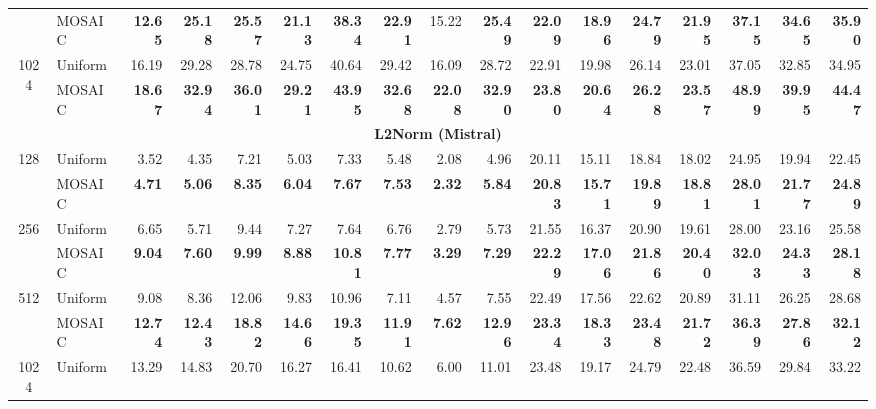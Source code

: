 \begin{table}[tp]
\begin{tabular}{@{} c l rrrr rrrr rrrr rrr @{}}
     & MOSAIC & \textbf{12.65} & \textbf{25.18} & \textbf{25.57} & \textbf{21.13} & \textbf{38.34} & \textbf{22.91} & 15.22 & \textbf{25.49} & \textbf{22.09} & \textbf{18.96} & \textbf{24.79} & \textbf{21.95} & \textbf{37.15} & \textbf{34.65} & \textbf{35.90} \\
    \cmidrule(l){1-17}
    \multirow{2}{*}{1024} & Uniform & 16.19 & 29.28 & 28.78 & 24.75 & 40.64 & 29.42 & 16.09 & 28.72 & 22.91 & 19.98 & 26.14 & 23.01 & 37.05 & 32.85 & 34.95 \\
     & MOSAIC & \textbf{18.67} & \textbf{32.94} & \textbf{36.01} & \textbf{29.21} & \textbf{43.95} & \textbf{32.68} & \textbf{22.08} & \textbf{32.90} & \textbf{23.80} & \textbf{20.64} & \textbf{26.28} & \textbf{23.57} & \textbf{48.99} & \textbf{39.95} & \textbf{44.47} \\
    \midrule
    \multicolumn{17}{c}{\textbf{L2Norm (Mistral)}} \\
    \midrule
    \multirow{2}{*}{128} & Uniform & 3.52 & 4.35 & 7.21 & 5.03 & 7.33 & 5.48 & 2.08 & 4.96 & 20.11 & 15.11 & 18.84 & 18.02 & 24.95 & 19.94 & 22.45 \\
     & MOSAIC & \textbf{4.71} & \textbf{5.06} & \textbf{8.35} & \textbf{6.04} & \textbf{7.67} & \textbf{7.53} & \textbf{2.32} & \textbf{5.84} & \textbf{20.83} & \textbf{15.71} & \textbf{19.89} & \textbf{18.81} & \textbf{28.01} & \textbf{21.77} & \textbf{24.89} \\
    \cmidrule(l){1-17}
    \multirow{2}{*}{256} & Uniform & 6.65 & 5.71 & 9.44 & 7.27 & 7.64 & 6.76 & 2.79 & 5.73 & 21.55 & 16.37 & 20.90 & 19.61 & 28.00 & 23.16 & 25.58 \\
     & MOSAIC & \textbf{9.04} & \textbf{7.60} & \textbf{9.99} & \textbf{8.88} & \textbf{10.81} & \textbf{7.77} & \textbf{3.29} & \textbf{7.29} & \textbf{22.29} & \textbf{17.06} & \textbf{21.86} & \textbf{20.40} & \textbf{32.03} & \textbf{24.33} & \textbf{28.18} \\
    \cmidrule(l){1-17}
    \multirow{2}{*}{512} & Uniform & 9.08 & 8.36 & 12.06 & 9.83 & 10.96 & 7.11 & 4.57 & 7.55 & 22.49 & 17.56 & 22.62 & 20.89 & 31.11 & 26.25 & 28.68 \\
     & MOSAIC & \textbf{12.74} & \textbf{12.43} & \textbf{18.82} & \textbf{14.66} & \textbf{19.35} & \textbf{11.91} & \textbf{7.62} & \textbf{12.96} & \textbf{23.34} & \textbf{18.33} & \textbf{23.48} & \textbf{21.72} & \textbf{36.39} & \textbf{27.86} & \textbf{32.12} \\
    \cmidrule(l){1-17}
    \multirow{2}{*}{1024} & Uniform & 13.29 & 14.83 & 20.70 & 16.27 & 16.41 & 10.62 & 6.00 & 11.01 & 23.48 & 19.17 & 24.79 & 22.48 & 36.59 & 29.84 & 33.22 \\

\end{tabular}
\end{table}
